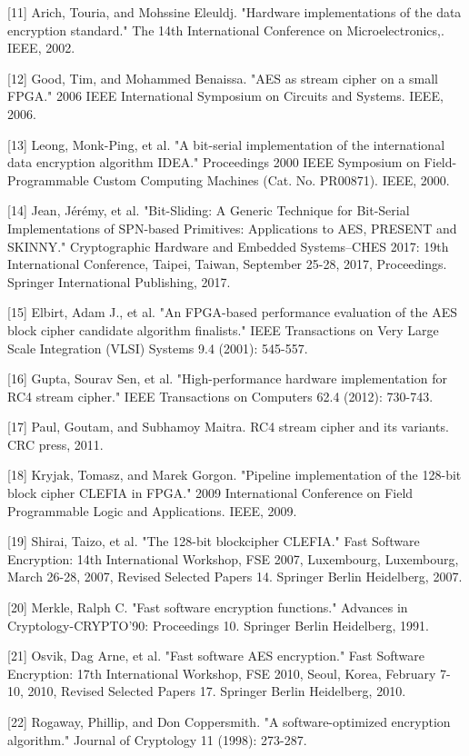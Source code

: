 \documentclass{ctexart}
\begin{document}
[11] Arich, Touria, and Mohssine Eleuldj. "Hardware implementations of the data encryption standard." The 14th International Conference on Microelectronics,. IEEE, 2002.

[12] Good, Tim, and Mohammed Benaissa. "AES as stream cipher on a small FPGA." 2006 IEEE International Symposium on Circuits and Systems. IEEE, 2006.

[13] Leong, Monk-Ping, et al. "A bit-serial implementation of the international data encryption algorithm IDEA." Proceedings 2000 IEEE Symposium on Field-Programmable Custom Computing Machines (Cat. No. PR00871). IEEE, 2000.

[14] Jean, Jérémy, et al. "Bit-Sliding: A Generic Technique for Bit-Serial Implementations of SPN-based Primitives: Applications to AES, PRESENT and SKINNY." Cryptographic Hardware and Embedded Systems–CHES 2017: 19th International Conference, Taipei, Taiwan, September 25-28, 2017, Proceedings. Springer International Publishing, 2017.

[15] Elbirt, Adam J., et al. "An FPGA-based performance evaluation of the AES block cipher candidate algorithm finalists." IEEE Transactions on Very Large Scale Integration (VLSI) Systems 9.4 (2001): 545-557.

[16] Gupta, Sourav Sen, et al. "High-performance hardware implementation for RC4 stream cipher." IEEE Transactions on Computers 62.4 (2012): 730-743.

[17] Paul, Goutam, and Subhamoy Maitra. RC4 stream cipher and its variants. CRC press, 2011.

[18] Kryjak, Tomasz, and Marek Gorgon. "Pipeline implementation of the 128-bit block cipher CLEFIA in FPGA." 2009 International Conference on Field Programmable Logic and Applications. IEEE, 2009.

[19] Shirai, Taizo, et al. "The 128-bit blockcipher CLEFIA." Fast Software Encryption: 14th International Workshop, FSE 2007, Luxembourg, Luxembourg, March 26-28, 2007, Revised Selected Papers 14. Springer Berlin Heidelberg, 2007.

[20] Merkle, Ralph C. "Fast software encryption functions." Advances in Cryptology-CRYPTO’90: Proceedings 10. Springer Berlin Heidelberg, 1991.

[21] Osvik, Dag Arne, et al. "Fast software AES encryption." Fast Software Encryption: 17th International Workshop, FSE 2010, Seoul, Korea, February 7-10, 2010, Revised Selected Papers 17. Springer Berlin Heidelberg, 2010.

[22] Rogaway, Phillip, and Don Coppersmith. "A software-optimized encryption algorithm." Journal of Cryptology 11 (1998): 273-287.
\end{document}
